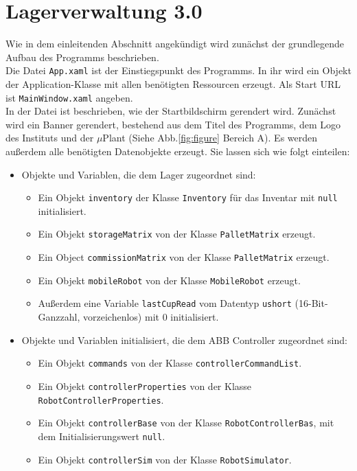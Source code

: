     \section {Lagerverwaltung 3.0}

    Wie in dem einleitenden Abschnitt angekündigt wird zunächst der grundlegende Aufbau des Programms beschrieben.
    \\
    Die Datei \verb|App.xaml| ist der Einstiegspunkt des Programms.
    In ihr wird ein Objekt der Application-Klasse mit allen benötigten Ressourcen erzeugt.
    Als Start URL ist \verb|MainWindow.xaml| angeben.
    \\
    In der Datei ist beschrieben, wie der Startbildschirm gerendert wird.
    Zunächst wird ein Banner gerendert, bestehend aus dem Titel des Programms, dem Logo des Instituts und der $\mu$Plant
    (Siehe Abb.\ref{fig:figure} Bereich \glqq A\grqq).
    Es werden außerdem alle benötigten Datenobjekte erzeugt.
    Sie lassen sich wie folgt einteilen:
    \\
    \begin{itemize}
        \item Objekte und Variablen, die dem Lager zugeordnet sind:
            \begin{itemize}
                \item Ein Objekt \verb|inventory| der Klasse \verb|Inventory| für das Inventar mit \verb|null| initialisiert.
                \item Ein Objekt \verb|storageMatrix| von der Klasse \verb|PalletMatrix| erzeugt.
                \item Ein Object \verb|commissionMatrix| von der Klasse \verb|PalletMatrix| erzeugt.
                \item Ein Objekt \verb|mobileRobot| von der Klasse \verb |MobileRobot| erzeugt.
                \item Außerdem eine Variable \verb|lastCupRead| vom Datentyp \verb|ushort| (16-Bit-Ganzzahl, vorzeichenlos) mit 0 initialisiert.
            \end{itemize}
            \item Objekte und Variablen initialisiert, die dem ABB Controller zugeordnet sind:
            \begin{itemize}
                \item Ein Objekt \verb|commands| von der Klasse \verb|controllerCommandList|.
                \item Ein Objekt \verb|controllerProperties| von der Klasse \verb|RobotControllerProperties|.
                \item Ein Objekt \verb|controllerBase| von der Klasse \verb|RobotControllerBas|, mit dem Initialisierungswert \verb|null|.
                \item Ein Objekt \verb|controllerSim| von der Klasse \verb|RobotSimulator|.
            \end{itemize}
    \end{itemize}
